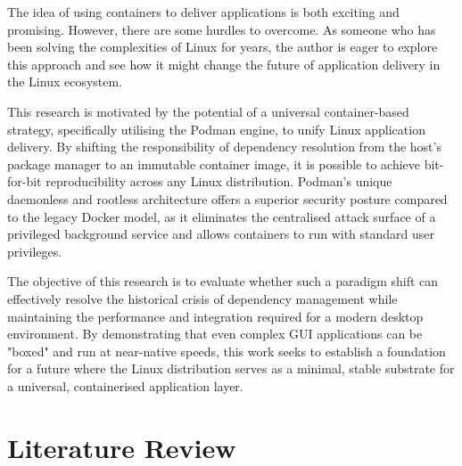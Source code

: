 \documentclass[journal,onecolumn]{IEEEtran}
\begin{document}
The idea of using containers to deliver applications is both exciting and promising. However, there are some hurdles to overcome. As someone who has been solving the complexities of Linux for years, the author is eager to explore this approach and see how it might change the future of application delivery in the Linux ecosystem. 

This research is motivated by the potential of a universal container-based strategy, specifically utilising the Podman engine, to unify Linux application delivery. By shifting the responsibility of dependency resolution from the host's package manager to an immutable container image, it is possible to achieve bit-for-bit reproducibility across any Linux distribution. Podman’s unique daemonless and rootless architecture offers a superior security posture compared to the legacy Docker model, as it eliminates the centralised attack surface of a privileged background service and allows containers to run with standard user privileges.

The objective of this research is to evaluate whether such a paradigm shift can effectively resolve the historical crisis of dependency management while maintaining the performance and integration required for a modern desktop environment. By demonstrating that even complex GUI applications can be "boxed" and run at near-native speeds, this work seeks to establish a foundation for a future where the Linux distribution serves as a minimal, stable substrate for a universal, containerised application layer.


\newpage
\section{Literature Review}
\end{document}

